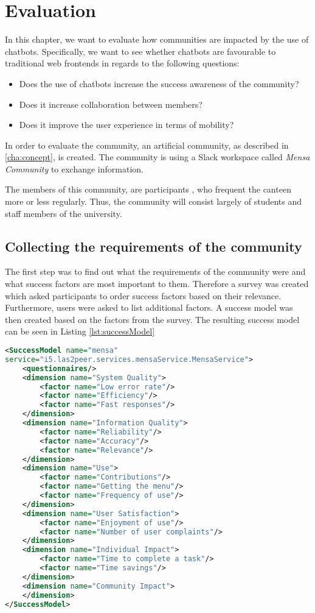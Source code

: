 \chapter{Evaluation}\label{cha:eval}
In this chapter, we want to evaluate how communities are impacted by the use of chatbots.
Specifically, we want to see whether chatbots are favourable to traditional web frontends in regards to the following questions:
\begin{itemize}
    \item Does the use of chatbots increase the success awareness of the community?
    \item Does it increase collaboration between members?
    \item Does it improve the user experience in terms of mobility?
\end{itemize}

In order to evaluate the community, an artificial community, as described in \ref{cha:concept}, is created.  The community is using a Slack workspace called \emph{Mensa Community} to exchange information.

The members of this community, are participants , who frequent the canteen more or less regularly.
Thus, the community will consist largely of students and staff members of the university.

\section{Collecting the requirements of the community}
The first step was to find out what the requirements of the community were and what success factors are most important to them. Therefore a survey was created which asked participants to order success factors based on their relevance. 
Furthermore, users were asked to list additional factors.
A success model was then created based on the factors from the survey. The resulting success model can be seen in Listing \ref{lst:successModel}

\begin{lstlisting}[language=XML,caption=Success Model based on requirements, label=lst:successModel]
<SuccessModel name="mensa" 
service="i5.las2peer.services.mensaService.MensaService">
    <questionnaires/>
    <dimension name="System Quality">
        <factor name="Low error rate"/>
        <factor name="Efficiency"/>
        <factor name="Fast responses"/>
    </dimension>
    <dimension name="Information Quality">
        <factor name="Reliability"/>
        <factor name="Accuracy"/>
        <factor name="Relevance"/>
    </dimension>
    <dimension name="Use">
        <factor name="Contributions"/>
        <factor name="Getting the menu"/>
        <factor name="Frequency of use"/>
    </dimension>
    <dimension name="User Satisfaction">
        <factor name="Enjoyment of use"/>
        <factor name="Number of user complaints"/>
    </dimension>
    <dimension name="Individual Impact">
        <factor name="Time to complete a task"/>
        <factor name="Time savings"/>
    </dimension>
    <dimension name="Community Impact">
    </dimension>
</SuccessModel>
\end{lstlisting}

